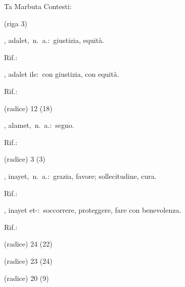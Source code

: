 \begin{glossario}{Ta Marbuta}
Contesti:
\begin{subvocedue}
\item[(riga 3)] 
\end{subvocedue}
\item[{\color{colorlowref}\spzrl{`adAla_T}},] {\sf adalet},\ n.\ a.:\ giustizia, equità.
\begin{subvocedue}
\item[Rif.:] 
\end{subvocedue}
\begin{subvocedue}
\item[\subglossariobullet] , {\sf adalet ile}:\ con giustizia, con equità.
\begin{subvocedue}
\item[Rif.:] 
\end{subvocedue}
\item[(radice)]   12 (18)
\end{subvocedue}
\item[{\color{colorlowref}\spzrl{`alAma_T}},] {\sf alamet},\ n.\ a.:\ segno.
\begin{subvocedue}
\item[Rif.:] 
\end{subvocedue}
\begin{subvocedue}
\item[(radice)]   3 (3)
\end{subvocedue}
\item[{\color{colorlowref}\spzrl{`inAya_T}},] {\sf inayet},\ n.\ a.:\ grazia, favore; sollecitudine, cura.
\begin{subvocedue}
\item[Rif.:] 
\end{subvocedue}
\begin{subvocedue}
\item[\subglossariobullet] , {\sf inayet et-}:\ soccorrere, proteggere, fare con benevolenza.
\begin{subvocedue}
\item[Rif.:] 
\end{subvocedue}
\item[(radice)]   24 (22)
\item[(radice)]   23 (24)
\item[(radice)]   20 (9)

\end{subvocedue}
\end{glossario}
